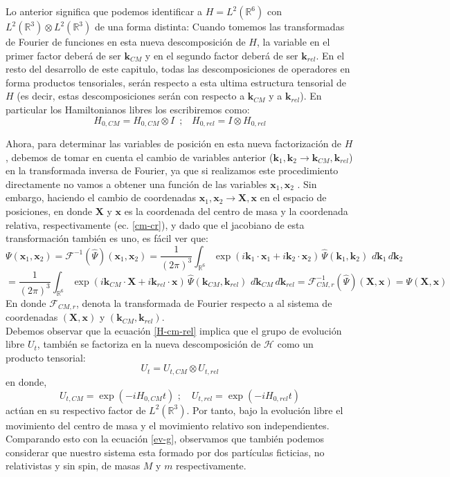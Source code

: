 \documentclass[12pt]{book}
\numberwithin{equation}{chapter}
\def\R{\mathbb{R}}
\def\rar{\rightarrow}
\def\H{\mathcal{H}}
\def\F{\mathcal{F}}
\def\pr{\otimes}
\def\x{\mathbf{x}}
\def\xx{\mathbf{X}}
\def\k{\mathbf{k}}
\begin{document}
Lo anterior significa que podemos identificar a $H=L^{2}(\R^{6})$ con $ L^{2}(\R^{3}) \pr L^{2}(\R^{3}) $ de una forma distinta: Cuando tomemos las transformadas de Fourier de funciones en esta nueva descomposici\'on de $H$, la variable en el primer factor deber\'a de ser $\k_{CM}$ y en el segundo factor deber\'a de ser $\k_{rel}$. En el resto del desarrollo de este capitulo, todas las descomposiciones de operadores en forma  productos tensoriales, ser\'an respecto a esta ultima estructura tensorial de $H$ (es decir, estas descomposiciones ser\'an con respecto a $\k_{CM}$ y a $\k_{rel}$). En particular los Hamiltonianos libres los escribiremos como:
\begin{equation}
H_{0,CM}= H_{0,CM} \pr I \,\,\,;\,\,\,\,\, H_{0,rel}= I \pr H_{0,rel}
\end{equation}

Ahora, para determinar las variables de posici\'on en esta nueva factorizaci\'on de $H$, debemos de tomar en cuenta el cambio de variables anterior ($\k_{1},\k_{2} \rar \k_{CM},\k_{rel}$) en la transformada inversa de Fourier, ya que si realizamos este procedimiento directamente no vamos a obtener una funci\'on de las variables $\x_{1},\x_{2}$ . Sin embargo, haciendo el cambio de coordenadas $ \x_{1},\x_{2} \rar \xx , \x $ en el espacio de posiciones, en donde $\xx$ y $\x$ es la coordenada del centro de masa y la coordenada relativa, respectivamente (ec. \eqref{cm-cr}), y dado que el jacobiano de esta transformaci\'on tambi\'en es uno, es f\'acil ver que:
$$ \Psi(\x_{1},\x_{2})=\F^{-1} ( \hat{\Psi} ) (\x_{1},\x_{2}) = \frac{1}{(2 \pi)^{3}} \int_{\R^{6}} \exp \left( i \k_{1} \cdot \x_{1} + i \k_{2} \cdot \x_{2} \right) \, \hat{\Psi}( \k_{1},\k_{2} ) \,\, d\k_{1} \, d\k_{2} $$
\begin{equation}
=\frac{1}{(2 \pi)^{3}} \int_{\R^{6}} \exp \left( i \k_{CM} \cdot \xx + i \k_{rel} \cdot \x \right) \, \hat{\Psi}( \k_{CM},\k_{rel} ) \,\, d\k_{CM} \, d\k_{rel} =\F_{CM,r}^{-1}(\hat{\Psi})( \xx , \x ) =\Psi( \xx , \x )
\end{equation}
En donde $\F_{CM,r}$, denota la transformada de Fourier respecto a al sistema de coordenadas $(\xx,\x)$ y $(\k_{CM},\k_{rel})$.\\

Debemos observar que la ecuaci\'on \eqref{H-cm-rel} implica que el grupo de evoluci\'on libre $U_{t}$, tambi\'en se factoriza en la nueva descomposici\'on de $\H$ como un producto tensorial:
\begin{equation}
U_{t}= U_{t,CM} \pr U_{t,rel}
\end{equation}
en donde,
\begin{equation}
U_{t,CM} = \exp (-i H_{0,CM} t) \,\,;\,\,\,\,\,\, U_{t,rel}= \exp (-i H_{0,rel} t)
\end{equation}
act\'uan en su respectivo factor de $L^{2}(\R^{3})$. Por tanto, bajo la evoluci\'on libre el movimiento del centro de masa y el movimiento relativo son independientes. Comparando esto con la ecuaci\'on \eqref{ev-g}, observamos que tambi\'en podemos considerar que nuestro sistema esta formado por dos part\'iculas ficticias, no relativistas y sin spin, de masas $M$ y $m$ respectivamente.\\
\end{document}
